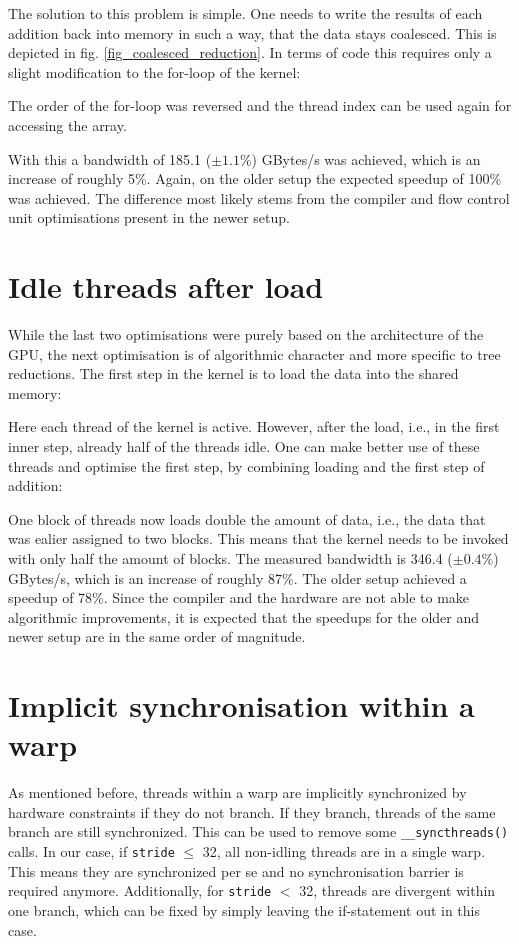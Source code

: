 The solution to this problem is simple.
One needs to write the results of each addition back into memory in such a way, that the data stays coalesced.
This is depicted in fig. \ref{fig_coalesced_reduction}.
In terms of code this requires only a slight modification to the for-loop of the kernel:

The order of the for-loop was reversed and the thread index can be used again for accessing the array.

With this a bandwidth of 185.1 (\( \pm 1.1\% \)) GBytes/s was achieved, which is an increase of roughly 5\%.
Again, on the older setup the expected speedup of 100\% was achieved.
The difference most likely stems from the compiler and flow control unit optimisations present in the newer setup.


\section{Idle threads after load}
While the last two optimisations were purely based on the architecture of the GPU, the next optimisation is of algorithmic character and more specific to tree reductions.
The first step in the kernel is to load the data into the shared memory:

Here each thread of the kernel is active.
However, after the load, i.e., in the first inner step, already half of the threads idle.
One can make better use of these threads and optimise the first step, by combining loading and the first step of addition:

One block of threads now loads double the amount of data, i.e., the data that was ealier assigned to two blocks.
This means that the kernel needs to be invoked with only half the amount of blocks.
The measured bandwidth is 346.4 (\( \pm 0.4\% \)) GBytes/s, which is an increase of roughly 87\%.
The older setup achieved a speedup of 78\%.
Since the compiler and the hardware are not able to make algorithmic improvements, it is expected that the speedups for the older and newer setup are in the same order of magnitude.

\section{Implicit synchronisation within a warp}
As mentioned before, threads within a warp are implicitly synchronized by hardware constraints if they do not branch.
If they branch, threads of the same branch are still synchronized.
This can be used to remove some \texttt{\_\_syncthreads()} calls.
In our case, if \texttt{stride} \(\le\) 32, all non-idling threads are in a single warp. 
This means they are synchronized per se and no synchronisation barrier is required anymore.
Additionally, for \texttt{stride} \(<\) 32, threads are divergent within one branch, which can be fixed by simply leaving the if-statement out in this case.

